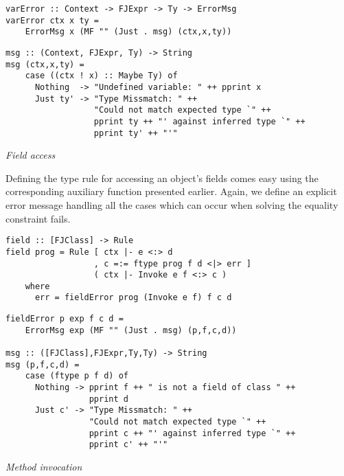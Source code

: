 \begin{lstlisting}
varError :: Context -> FJExpr -> Ty -> ErrorMsg
varError ctx x ty =
    ErrorMsg x (MF "" (Just . msg) (ctx,x,ty))
\end{lstlisting}

\begin{lstlisting}
msg :: (Context, FJExpr, Ty) -> String
msg (ctx,x,ty) =
    case ((ctx ! x) :: Maybe Ty) of
      Nothing  -> "Undefined variable: " ++ pprint x
      Just ty' -> "Type Missmatch: " ++
                  "Could not match expected type `" ++
                  pprint ty ++ "' against inferred type `" ++
                  pprint ty' ++ "'"
\end{lstlisting}

\bigskip\textit{Field access}

\smallskip

Defining the type rule for accessing an object's fields comes easy
using the corresponding auxiliary function presented earlier. Again,
we define an explicit error message handling all the cases which can
occur when solving the equality constraint fails.

\begin{lstlisting}
field :: [FJClass] -> Rule
field prog = Rule [ ctx |- e <:> d
                  , c =:= ftype prog f d <|> err ]
                  ( ctx |- Invoke e f <:> c )
    where
      err = fieldError prog (Invoke e f) f c d
\end{lstlisting}

\begin{lstlisting}
fieldError p exp f c d =
    ErrorMsg exp (MF "" (Just . msg) (p,f,c,d))
    
msg :: ([FJClass],FJExpr,Ty,Ty) -> String
msg (p,f,c,d) =
    case (ftype p f d) of
      Nothing -> pprint f ++ " is not a field of class " ++
                 pprint d
      Just c' -> "Type Missmatch: " ++
                 "Could not match expected type `" ++
                 pprint c ++ "' against inferred type `" ++
                 pprint c' ++ "'"
\end{lstlisting}

\bigskip\textit{Method invocation}

\smallskip

